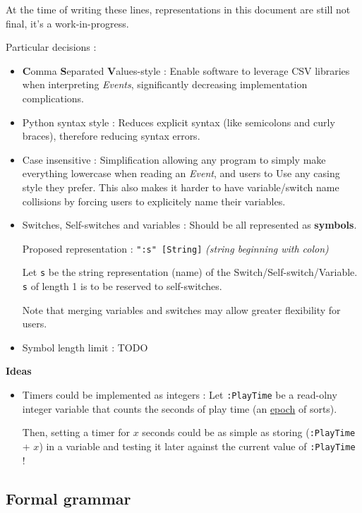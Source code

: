 \documentclass[11pt]{article}
\begin{document}
At the time of writing these lines, representations in this document are still not final, it's a work-in-progress.

Particular decisions :
\begin{itemize}
	\item \textbf{C}omma \textbf{S}eparated \textbf{V}alues-style : Enable software to leverage CSV libraries when interpreting \textit{Events}, significantly decreasing implementation complications.
	
	\item Python syntax style : Reduces explicit syntax (like semicolons and curly braces), therefore reducing syntax errors.
	
	\item Case insensitive : Simplification allowing any program to simply make everything lowercase when reading an \textit{Event}, and users to Use any casing style they prefer. This also makes it harder to have variable/switch name collisions by forcing users to explicitely name their variables.
	
	\item Switches, Self-switches and variables : Should be all represented as \textbf{symbols}. 
	
	Proposed representation : \verb|":s" [String]| \textit{(string beginning with colon)}
	
	Let \verb|s| be the string representation (name) of the Switch/Self-switch/Variable. \verb|s| of length 1 is to be reserved to self-switches.
	
	Note that merging variables and switches may allow greater flexibility for users.
	
	\item Symbol length limit : TODO
	
\end{itemize}


\textbf{Ideas}
\begin{itemize}
	\item Timers could be implemented as integers : Let \verb|:PlayTime| be a read-olny integer variable that counts the seconds of play time (an \href{https://en.wikipedia.org/wiki/Epoch_(computing)}{epoch} of sorts).
	
	Then, setting a timer for $x$ seconds could be as simple as storing (\verb|:PlayTime| + $x$) in a variable and testing it later against the current value of \verb|:PlayTime| !
\end{itemize}

\newpage
\subsection{Formal grammar}
\end{document}
